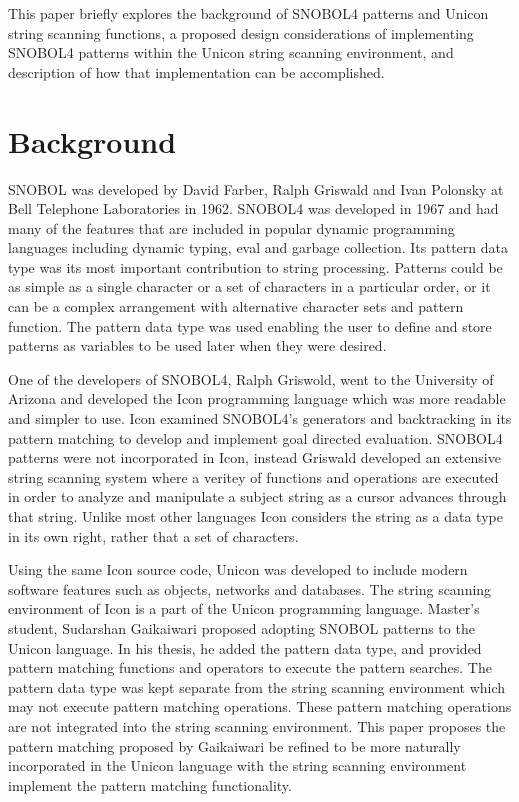 \documentclass{article}
\begin{document}
This paper briefly explores the background of SNOBOL4 patterns and Unicon string scanning functions, a proposed design considerations of implementing SNOBOL4 patterns within the Unicon string scanning environment, and description of how that implementation can be accomplished. 

\section{Background}

SNOBOL was developed by David Farber, Ralph Griswald and Ivan Polonsky at Bell Telephone Laboratories in 1962.  SNOBOL4 was developed in 1967 and had many of the features that are included in popular dynamic programming languages including dynamic typing, eval and garbage collection.  Its pattern data type was its most important contribution to string processing.  Patterns could be as simple as a single character or a set of characters in a particular order, or it can be a complex arrangement with alternative character sets and pattern function.  The pattern data type was used enabling the user to define and store patterns as variables to be used later when they were desired.\cite{Snobol}  

One of the developers of SNOBOL4, Ralph Griswold, went to the University of Arizona and developed the Icon programming language which was more readable and simpler to use.\cite{JefferyUnicon}  Icon examined SNOBOL4's generators and backtracking in its pattern matching to develop and implement goal directed evaluation.\cite{Gaikaiwari2005}  SNOBOL4 patterns were not incorporated in Icon, instead Griswald developed an extensive string scanning system where a veritey of functions and operations are executed in order to analyze and manipulate a subject string as a cursor advances through that string.  Unlike most other languages Icon considers the string as a data type in its own right, rather that a set of characters. \cite{GriswoldIcon}  

Using the same Icon source code, Unicon was developed to include modern software features such as objects, networks and databases. \cite{JefferyUnicon} The string scanning environment of Icon is a part of the Unicon programming language.  Master's student, Sudarshan Gaikaiwari proposed adopting SNOBOL patterns to the Unicon language.  In his thesis, he added the pattern data type, and provided pattern matching functions and operators to execute the pattern searches.\cite{Gaikaiwari2005}  The pattern data type was kept separate from the string scanning environment which may not execute pattern matching operations.  These pattern matching operations are not integrated into the string scanning environment.  This paper proposes the pattern matching proposed by Gaikaiwari be refined to be more naturally incorporated in the Unicon language with the string scanning environment implement the pattern matching functionality.
\end{document}

